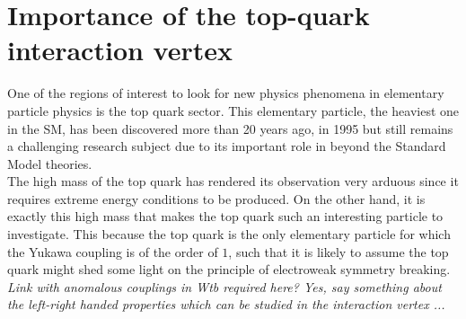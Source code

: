 \section{Importance of the top-quark interaction vertex} \label{sec::TopQuarkPhysics}
One of the regions of interest to look for new physics phenomena in elementary particle physics is the top quark sector. This elementary particle, the heaviest one in the SM, has been discovered more than 20 years ago, in 1995 but still remains a challenging research subject due to its important role in beyond the Standard Model theories. 
\\
The high mass of the top quark has rendered its observation very arduous since it requires extreme energy conditions to be produced. 
On the other hand, it is exactly this high mass that makes the top quark such an interesting particle to investigate.
This because the top quark is the only elementary particle for which the Yukawa coupling is of the order of $1$, such that it is likely to assume the top quark might shed some light on the principle of electroweak symmetry breaking.
\\
\textit{Link with anomalous couplings in Wtb required here? Yes, say something about the left-right handed properties which can be studied in the interaction vertex ...}
%

